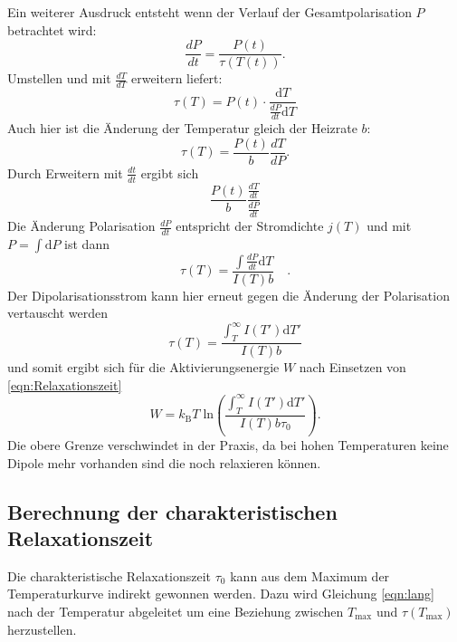         Ein weiterer Ausdruck entsteht wenn der Verlauf der Gesamtpolarisation $P$ betrachtet wird:
        \begin{equation}
            \frac{dP}{dt} = \frac{P(t)}{\tau(T(t))}.
        \end{equation}
        Umstellen und mit $\frac{dT}{dT}$ erweitern liefert:
        \begin{equation}
            \tau(T) = P(t) \cdot \frac{\text{d}T}{\frac{dP}{dt}\text{d}T}
        \end{equation}
        Auch hier ist die Änderung der Temperatur gleich der Heizrate $b$:
        \begin{equation}
            \tau(T) = \frac{P(t)}{b}\frac{dT}{dP}.
        \end{equation}
        Durch Erweitern mit $\frac{dt}{dt}$ ergibt sich
        \begin{equation}
            \frac{P(t)}{b} \frac{\frac{dT}{dt}}{\frac{dP}{dt}}
        \end{equation}
        Die Änderung Polarisation $\frac{dP}{dt}$ entspricht der Stromdichte $j(T)$ und mit $P = \int \text{d}P$ ist dann
        \begin{equation}
            \tau(T) = \frac{\int \frac{dP}{dt}\text{d}T}{I(T)b} \quad .
        \end{equation}
        Der Dipolarisationsstrom kann hier erneut gegen die Änderung der Polarisation vertauscht werden
        \begin{equation}
            \tau(T) = \frac{\int_T^\infty I(T')\text{d}T'}{I(T)b}
        \end{equation}
        und somit ergibt sich für die Aktivierungsenergie $W$ nach Einsetzen von \autoref{eqn:Relaxationszeit}
        \begin{equation}
            W = k_\text{B}T\;\text{ln}\left( \frac{\int_T^\infty I(T')\text{d}T'}{I(T)b\tau_0}\right).
            \label{eqn:int}
        \end{equation}
        Die obere Grenze verschwindet in der Praxis, da bei hohen Temperaturen keine Dipole mehr vorhanden sind die noch relaxieren können.

\subsection{Berechnung der charakteristischen Relaxationszeit}

Die charakteristische Relaxationszeit $\tau_0$ kann aus dem Maximum der Temperaturkurve indirekt gewonnen werden.
Dazu wird Gleichung \ref{eqn:lang} nach der Temperatur abgeleitet um eine Beziehung zwischen $T_\text{max}$ und $\tau(T_\text{max})$ herzustellen.

